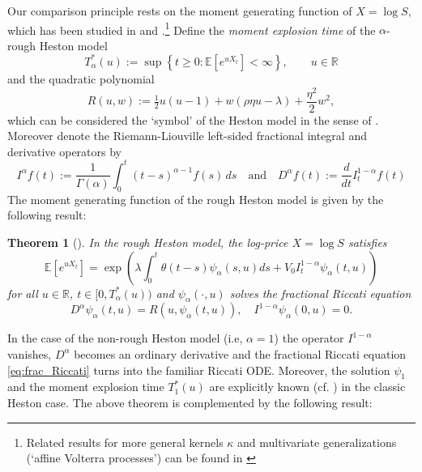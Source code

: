 \documentclass[12pt,a4paper]{amsart}
\numberwithin{equation}{section}
\numberwithin{equation}{section}
\newtheorem{theorem}{Theorem}[section]
\theoremstyle{nonumberplain}
\newcommand{\RR}{\mathbb{R}}
\newcommand{\EE}{\mathbb{E}}
\newcommand{\E}[1]{\mathbb{E}\left[#1\right]}                     %
\newcommand{\set}[1]{\left\{#1\right\}}
\begin{document}
Our comparison principle rests on the moment generating function of $X = \log S$, which has been studied in \cite{eleuch2018perfect} and \cite{gerhold2018moment}.\footnote{Related results for more general kernels $\kappa$ and multivariate generalizations (`affine Volterra processes') can be found in \cite{jaber2017affine, gatheral2018affine}} Define the \emph{moment explosion time} of the $\alpha$-rough Heston model
\begin{equation}\label{eq:moment_explosion}
T_\alpha^*(u) := \sup \set{t \ge 0: \E{e^{uX_t}} < \infty}, \qquad u \in \RR
\end{equation}
and the quadratic polynomial
\begin{equation}\label{eq:Rdef}
R(u,w) := \tfrac{1}{2}u(u-1) + w (\rho \eta u - \lambda) +\frac{\eta^2}{2}w^2,
\end{equation}
which can be considered the `symbol' of the Heston model in the sense of \cite{hoh1998symbolic}. Moreover denote the Riemann-Liouville left-sided fractional integral and derivative operators by
\begin{equation*}
	I^{\alpha} f(t) := \frac{1}{\Gamma(\alpha)} \int_0^t (t-s)^{\alpha - 1} f(s) \, ds \quad \text{and} \quad D^{\alpha} f(t) := \frac{d}{d t} I_t^{1-\alpha} f(t)
\end{equation*}
The moment generating function of the rough Heston model is given by the following result:
\begin{theorem}[\cite{eleuch2018perfect, gerhold2018moment}]\label{thm:mgf1}
In the rough Heston model, the log-price $X = \log S$ satisfies 
\begin{equation}\label{eq:rough_Heston_char_func}
	\EE \left[ e^{u X_t} \right] = \exp \left( \lambda \int_0^t \theta(t-s) \psi_{\alpha}(s,u)ds  + V_0 I^{1-\alpha}_t \psi_{\alpha}(t,u) \right)\end{equation}
for all $u \in  \RR$, $t \in [0,T_\alpha^*(u))$ and $\psi_{\alpha}(\cdot,u)$ solves the fractional Riccati equation
\begin{equation}\label{eq:frac_Riccati}
	 D^{\alpha} \psi_{\alpha}(t,u) = R(u,\psi_{\alpha}(t,u)), \quad I^{1-\alpha} \psi_{\alpha}(0,u) = 0.
\end{equation}
\end{theorem}
In the case of the non-rough Heston model (i.e, $\alpha = 1$) the operator $I^{1-\alpha}$ vanishes, $D^{\alpha}$ becomes an ordinary derivative and the fractional Riccati equation \eqref{eq:frac_Riccati} turns into the familiar Riccati ODE. Moreover, the solution $\psi_1$ and the moment explosion time $T^*_1(u)$ are explicitly known (cf. \cite{andersen2007moment, keller-ressel2011moment}) in the classic Heston case. The above theorem is complemented by the following result:
\end{document}
